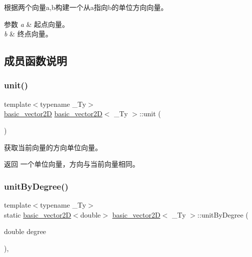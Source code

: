根据两个向量a,b构建一个从a指向b的单位方向向量。 


\begin{DoxyParams}{参数}
{\em a} & 起点向量。 \\
\hline
{\em b} & 终点向量。 \\
\hline
\end{DoxyParams}


\subsection{成员函数说明}
\mbox{\label{structbasic__vector2_d_aa4b24c577ef24c814370beebc22f3bb8}} 
\subsubsection{\texorpdfstring{unit()}{unit()}}
{\footnotesize\ttfamily template$<$typename \+\_\+\+Ty$>$ \\
\hyperlink{structbasic__vector2_d}{basic\+\_\+vector2D} \hyperlink{structbasic__vector2_d}{basic\+\_\+vector2D}$<$ \+\_\+\+Ty $>$\+::unit (\begin{DoxyParamCaption}{ }\end{DoxyParamCaption})\hspace{0.3cm}{\ttfamily [inline]}}



获取当前向量的方向单位向量。 

\begin{DoxyReturn}{返回}
一个单位向量，方向与当前向量相同。 
\end{DoxyReturn}
\mbox{\label{structbasic__vector2_d_aa31b5b9b9261d28ecd2626ba38b61278}} 
\subsubsection{\texorpdfstring{unit\+By\+Degree()}{unitByDegree()}}
{\footnotesize\ttfamily template$<$typename \+\_\+\+Ty$>$ \\
static \hyperlink{structbasic__vector2_d}{basic\+\_\+vector2D}$<$double$>$ \hyperlink{structbasic__vector2_d}{basic\+\_\+vector2D}$<$ \+\_\+\+Ty $>$\+::unit\+By\+Degree (\begin{DoxyParamCaption}\item[{double}]{degree }\end{DoxyParamCaption})\hspace{0.3cm}{\ttfamily [inline]}, {\ttfamily [static]}}



